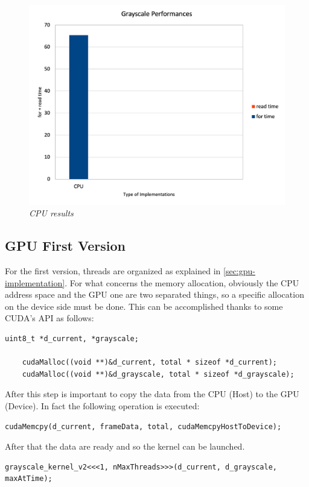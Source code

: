 \documentclass[paper=a4, fontsize=10pt]{scrartcl}	%
\begin{document}
	\begin{figure}[H]
		\centering
		\includegraphics[width=0.65\linewidth]{images/bw/Picture 1.png}
		\caption{\textit{CPU results}}
		\label{fig:cpu-results}
	\end{figure}

	\subsection{GPU First Version}
	For the first version, threads are organized as explained in \autoref{sec:gpu-implementation}. For what concerns the memory allocation, obviously the CPU address space and the GPU one are two separated things, so a specific allocation on the device side must be done. This can be accomplished thanks to some CUDA's API as follows:

	\begin{lstlisting}[style=CStyle]
	uint8_t *d_current, *grayscale;

	cudaMalloc((void **)&d_current, total * sizeof *d_current);
	cudaMalloc((void **)&d_grayscale, total * sizeof *d_grayscale);
	\end{lstlisting}

	After this step is important to copy the data from the CPU (Host) to the GPU (Device). In fact the following operation is executed:

	\begin{lstlisting}[style=CStyle]	
	cudaMemcpy(d_current, frameData, total, cudaMemcpyHostToDevice);
	\end{lstlisting}

	After that the data are ready and so the kernel can be launched.

	\begin{lstlisting}[style=CStyle]	
	grayscale_kernel_v2<<<1, nMaxThreads>>>(d_current, d_grayscale, maxAtTime);
	\end{lstlisting}
	
\end{document}
